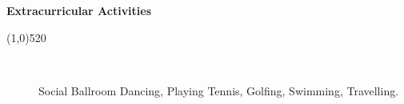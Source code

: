 \documentclass[letterpaper,10pt]{article}
\newcommand{\heading}[1] {
  {\large
    \begin{minipage}
    {\textwidth}
    {\textbf{#1}}
    \end{minipage}
  }
  \begin{center}
  \vspace{-15pt}
  \line(1,0){520}
  \end{center}
}
\begin{document}
\heading{Extracurricular Activities}

\begin{description}

\item[~~~~~] Social Ballroom Dancing, Playing Tennis, Golfing, Swimming, Travelling.

\end{description}
\end{document}
